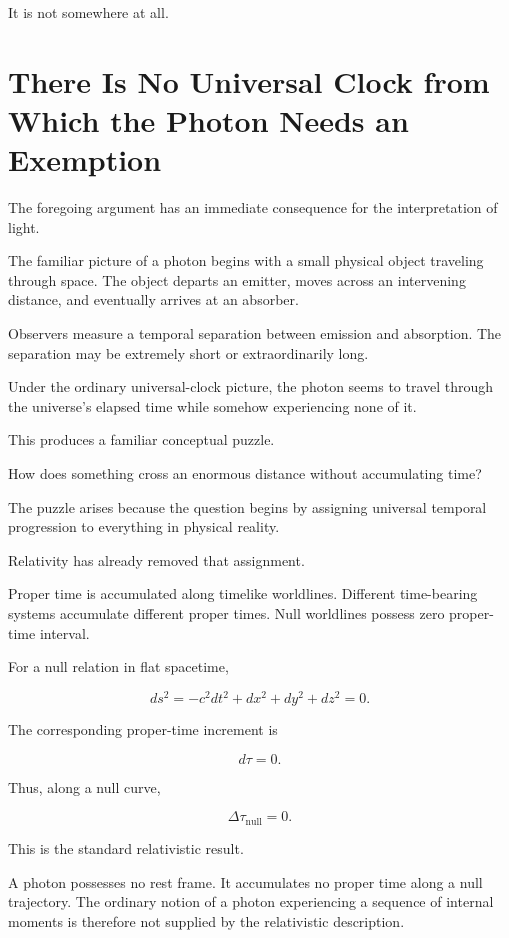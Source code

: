 \documentclass[12pt,onecolumn]{article}
\begin{document}
It is not somewhere at all.

\section{There Is No Universal Clock from Which the Photon Needs an Exemption}

The foregoing argument has an immediate consequence for the interpretation of light.

The familiar picture of a photon begins with a small physical object traveling through space. The object departs an emitter, moves across an intervening distance, and eventually arrives at an absorber.

Observers measure a temporal separation between emission and absorption. The separation may be extremely short or extraordinarily long.

Under the ordinary universal-clock picture, the photon seems to travel through the universe's elapsed time while somehow experiencing none of it.

This produces a familiar conceptual puzzle.

How does something cross an enormous distance without accumulating time?

The puzzle arises because the question begins by assigning universal temporal progression to everything in physical reality.

Relativity has already removed that assignment.

Proper time is accumulated along timelike worldlines. Different time-bearing systems accumulate different proper times. Null worldlines possess zero proper-time interval.

For a null relation in flat spacetime,

\begin{equation}
ds^2
=
-c^2dt^2+dx^2+dy^2+dz^2
=
0.
\end{equation}

The corresponding proper-time increment is

\begin{equation}
d\tau=0.
\end{equation}

Thus, along a null curve,

\begin{equation}
\Delta\tau_{\mathrm{null}}=0.
\end{equation}

This is the standard relativistic result.

A photon possesses no rest frame. It accumulates no proper time along a null trajectory. The ordinary notion of a photon experiencing a sequence of internal moments is therefore not supplied by the relativistic description.
\end{document}
